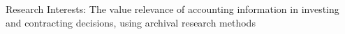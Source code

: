   \resumeSubHeadingListStart
    \vspace{1mm}
    \setlength{\itemsep}{0pt}\setlength{\parsep}{0pt}
    \item Research Interests: The value relevance of accounting information in investing and contracting decisions, using archival research methods
  \resumeSubHeadingListEnd
